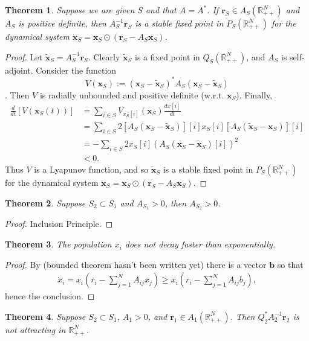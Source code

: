 \documentclass{article}
\newcommand{\R}{\mathbb{R}}
\newtheorem{thm}{Theorem}[section]
\newcommand{\1}{\mathbf{1}}
\newcommand{\0}{\mathbf{0}}
\renewcommand{\l}{\left}
\renewcommand{\r}{\right}
\newcommand{\x}{{\mathbf {{x}}}}
\newcommand{\cp}{{\mathbf {{r}}}}
\begin{document}
\begin{thm} \label{stable_sub}
Suppose we are given $S$ and that $A = A^*$.
If $\cp_S \in A_S(\R_{++}^N)$ and $A_S$ is positive definite, then $A_S^{-1} \cp_S$ is a stable fixed point in $P_S(\R_{++}^N)$ for the dynamical system $\dot{\x}_S = \x_S \odot (\cp_S - A_S \x_S)$.
\end{thm}

\begin{proof}
Let $\tilde{\x}_S = A_S^{-1} \cp_S$. 
Clearly $\tilde{\x}_S$ is a fixed point in $Q_S(\R_{++}^N)$, and $A_S$ is self-adjoint.
Consider the function $$V(\x_S) := (\x_S - \tilde{\x}_S)^*A_S(\x_S - \tilde{\x}_S)$$.
Then $V$ is radially unbounded and positive definite (w.r.t. $\x_S$).
Finally,
\begin{align*} 
\frac{d}{dt} [V(\x_S(t))] &= \sum_{i \in S} V_{x_S[i]}(\x_S) \frac{d x[i]}{dt} \\
&= \sum_{i \in S} 2[A_S(\x_S - \tilde{\x}_S)][i] x_S[i] [A_S(\tilde{\x}_S - \x_S)][i] \\
&= -\sum_{i \in S} 2 x_S[i] (A_S(\x_S - \tilde{\x}_S)[i])^2 \\
&<0.
\end{align*}
Thus $V$ is a Lyapunov function, and so $\tilde{\x}_S$ is a stable fixed point in $P_S(\R_{++}^N)$ for the dynamical system 
$\dot{\x}_S = \x_S \odot (\cp_S - A_S \x_S)$.
\end{proof}

\begin{thm} \label{incl_As}
Suppose $S_2 \subset S_1$ and $A_{S_1} > 0$, then $A_{S_2} > 0$.
\end{thm}

\begin{proof}
Inclusion Principle.
\end{proof}

\begin{thm} \label{exp_dec}
The population $x_i$ does not decay faster than exponentially.
\end{thm}

\begin{proof}
By (bounded theorem hasn't been written yet) there is a vector $\mathbf{b}$ so that
\begin{align*} 
\dot{x}_i = x_i \l( r_i - \sum_{j=1}^N A_{ij} x_j \r) \ge x_i \l( r_i - \sum_{j=1}^N A_{ij} b_j \r),
\end{align*}
hence the conclusion.
\end{proof}

\begin{thm} \label{largest_space}
Suppose $S_2 \subset S_1$, $A_1 >0$, and $\cp_1 \in A_1(\R_{++}^N)$. 
Then $Q_2^* A_2^{-1} \cp_2$ is not attracting in $\R_{++}^N$.
\end{thm}
\end{document}
